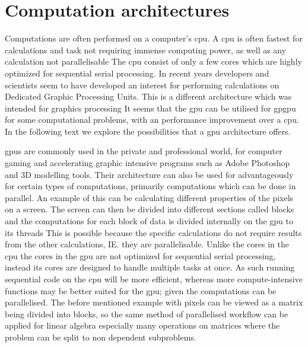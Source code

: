 \section{Computation architectures}
\label{sec:comparch}
Computations are often performed on a computer's  \acrfull{cpu}.
A \acrshort{cpu} is often fastest for calculations and task not requiring immense computing power, as well as any calculation not parallelisable
The \acrshort{cpu} consist of only a few cores which are highly optimized for sequential serial processing. \citep{whatisgpu}
In recent years developers and scientists seem to have developed an interest for performing calculations on Dedicated Graphic Processing Units. \citep{gpurise}
This is a different architecture which was intended for graphics processing
It seems that the \acrshort{gpu} can be utilised for \acrfull{gpgpu} for some computational problems, with an performance improvement over a \acrshort{cpu}.
In the following text we explore the possibilities that a \acrshort{gpu} architecture offers.

\acrshort{gpu}s are commonly used in the private and professional world, for computer gaming and accelerating graphic intensive programs such as Adobe Photoshop and 3D modelling tools. \citep{NVIDIAADOBE,STEAMHW}
Their architecture can also be used for advantageously for certain types of computations, primarily computations which can be done in parallel. 
An example of this can be calculating different properties of the pixels on a screen. 
The screen can then be divided into different sections called blocks and the computations for each block of data is divided internally on the \acrshort{gpu} to its threads
This is possible because the specific calculations do not require results from the other calculations, IE. they are parallelisable.
Unlike the cores in the \acrshort{cpu} the cores in the \acrshort{gpu} are not optimized for sequential serial processing, instead its cores are designed to handle multiple tasks at once. 
As such running sequential code on the \acrshort{cpu} will be more efficient, whereas more compute-intensive functions may be better suited for the \acrshort{gpu}; given the computations can be parallelised. \citep{NvidiaGPGPU}
The before mentioned example with pixels can be viewed as a matrix being divided into blocks, so the same method of parallelised workflow can be applied for linear algebra especially many operations on matrices where the problem can be split to non dependent subproblems.

